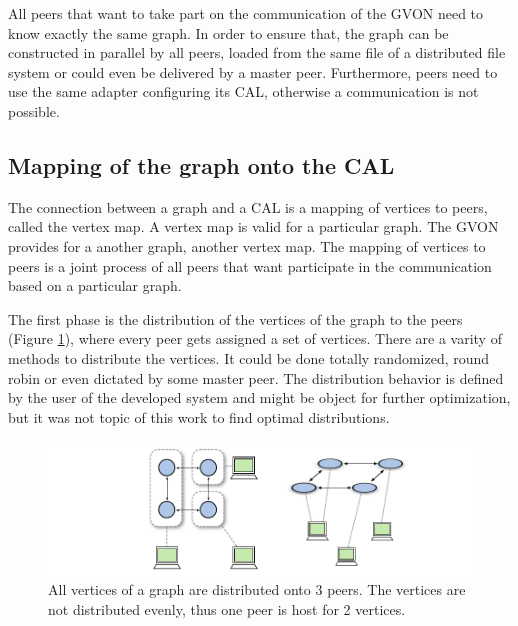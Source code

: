 All peers that want to take part on the communication of the GVON need
to know exactly the same graph. In order to ensure that, the graph can be
constructed in parallel by all peers, loaded from the same file of a
distributed file system or could even be delivered by a master
peer. Furthermore, peers need to use the same adapter configuring its
CAL, otherwise a communication is not possible.


\subsection{Mapping of the graph onto the CAL}
\label{sec:mapping}
The connection between a graph and a CAL is a mapping of vertices to
peers, called the vertex map.  A vertex map is valid for a particular
graph. The GVON provides for a another graph, another vertex map.  The
mapping of vertices to peers is a joint process of all peers that want
participate in the communication based on a particular graph.

The first phase is the distribution of the vertices of the graph to
the peers (Figure \ref{fig:gvon_mapping}), where every peer gets
assigned a set of vertices. There are a varity of methods to
distribute the vertices.  It could be done totally randomized, round
robin or even dictated by some master peer. The distribution behavior
is defined by the user of the developed system and might be object for
further optimization, but it was not topic of this work to find optimal
distributions.

\begin{figure}[H]
  \centering \includegraphics[width=\textwidth]{graphics/30_gon_mapping}
  \caption{All vertices of a graph are distributed onto 3 peers. The vertices
  are not distributed evenly, thus one peer is host for 2 vertices.}
  \label{fig:gvon_mapping}
\end{figure}

